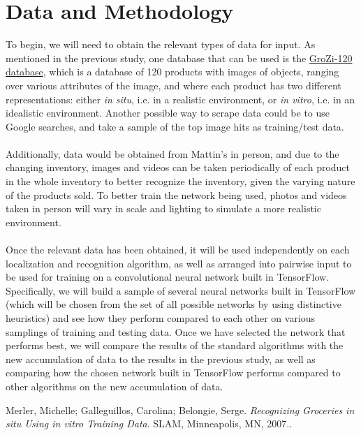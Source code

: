 \documentclass{article}
\begin{document}
\section{Data and Methodology}
To begin, we will need to obtain the relevant types of data for input. As mentioned in the previous study, one database that can be used is the \href{http://grozi.calit2.net/grozi.html}{GroZi-120 database}, which is a database of 120 products with images of objects, ranging over various attributes of the image, and where each product has two different representations: either \textit{in situ}, i.e. in a realistic environment, or \textit{in vitro}, i.e. in an idealistic environment. Another possible way to scrape data could be to use Google searches, and take a sample of the top image hits as training/test data.
\\ \\
Additionally, data would be obtained from Mattin's in person, and due to the changing inventory, images and videos can be taken periodically of each product in the whole inventory to better recognize the inventory, given the varying nature of the products sold. To better train the network being used, photos and videos taken in person will vary in scale and lighting to simulate a more realistic environment.
\\ \\
Once the relevant data has been obtained, it will be used independently on each localization and recognition algorithm, as well as arranged into pairwise input to be used for training on a convolutional neural network built in TensorFlow. Specifically, we will build a sample of several neural networks built in TensorFlow (which will be chosen from the set of all possible networks by using distinctive heuristics) and see how they perform compared to each other on various samplings of training and testing data. Once we have selected the network that performs best, we will compare the results of the standard algorithms with the new accumulation of data to the results in the previous study, as well as comparing how the chosen network built in TensorFlow performs compared to other algorithms on the new accumulation of data.

\begin{thebibliography}{9}
Merler, Michelle; Galleguillos, Carolina; Belongie, Serge.
\textit{Recognizing Groceries in situ Using in vitro Training Data}. 
SLAM, Minneapolis, MN, 2007..
 
\end{thebibliography}
\end{document}
